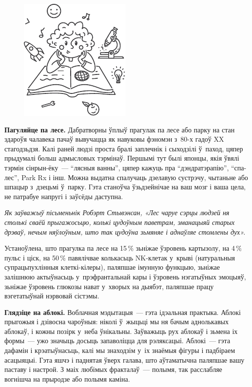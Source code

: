\begin{figure}[htb!]
  \centering
  \includegraphics[scale=1.5]{willpower/ch12/7.pdf}
\end{figure}

\textbf{Пагуляйце па лесе.} Дабратворны ўплыў прагулак па лесе або парку на стан здароўя чалавека пачаў вывучацца як навуковы фэномэн з~80-х гадоў XX стагодзьдзя. Калі раней людзі проста бралі заплечнік і сыходзілі ў~паход, цяпер прыдумалі больш адмысловых тэрмінаў. Першымі тут былі японцы, якія ўвялі тэрмін сінрын-ёку~--- ``лясныя ванны'', цяпер кажуць пра ``дэндратэрапію'', ``спа-лес'', Park Rx і інш. Можна выдатна спалучаць дзелавую сустрэчу, чытаньне або шпацыр з~дзецьмі ў~парку. Гэта станоўча ўзьдзейнічае на ваш мозг і ваша цела, не патрабуе напругі і заўсёды даступна.

\emph{Як заўважыў пісьменьнік Робэрт Стывэнсан, «Лес чаруе сэрцы людзей ня столькі сваёй прыгажосьцю, колькі цудоўным паветрам, эманацыяй старых дрэваў, нечым няўлоўным, што так цудоўна зьмяняе і аднаўляе стомлены дух».}

Устаноўлена, што прагулка па лесе на 15\,\% зьніжае ўзровень картызолу, на 4\,\% пульс і ціск, на 50\,\% павялічвае колькасьць NK-клетак у~крыві (натуральныя супрацьпухлінныя клеткі-кілеры), паляпшае імунную функцыю, зьніжае залішнюю актыўнасьць у~прэфрантальнай кары і ўзровень нэгатыўных эмоцыяў, зьніжае ўзровень глюкозы нават у~хворых на дыябэт, паляпшае працу вэгетатыўнай нэрвовай сістэмы.

\textbf{Глядзіце на аблокі.} Воблачная мэдытацыя~--- гэта ідэальная практыка. Аблокі прыгожыя і дзівосна чароўныя: ніколі ў~жыцьці мы ня бачым аднолькавых аблокаў, і кожны позірк у~неба ўнікальны. Заўважыць рух аблокаў і зьмена іх формы~--- ужо значыць досыць запаволіцца для рэляксацыі. Аблокі~--- гэта дафамін і крэатыўнасьць, калі мы знаходзім у~іх знаёмыя фігуры і падбіраем асацыяцыі. Гэта яшчэ і паднятая ўверх галава, што аўтаматычна паляпшае вашу паставу і настрой. З маіх любімых фракталаў~--- полымя, так расслабляе вогнішча на прыродзе або полымя каміна.

